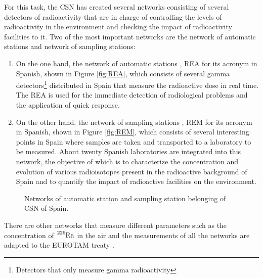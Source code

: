 \begin{enumerate}
For this task, the CSN has created several networks consisting of several detectors of radioactivity that are in charge of controlling the levels of radioactivity in the environment and checking the impact of radioactivity facilities to it. Two of the most important networks are the network of automatic stations and network of sampling stations:

\begin{enumerate}
\item{} On the one hand, the network of automatic stations \cite{REA}, REA for its acronym in Spanish, shown in Figure \ref{fig:REA}, which consists of several gamma detectors\footnote{Detectors that only measure gamma radioactivity} distributed in Spain that measure the radioactive dose in real time. The REA is used for the immediate detection of radiological problems and the application of quick response.

\item{} On the other hand, the network of sampling stations \cite{REM}, REM for its acronym in Spanish, shown in Figure \ref{fig:REM}, which consists of several interesting points in Spain where samples are taken and transported to a laboratory to be measured. About twenty Spanish laboratories are integrated into this network, the objective of which is to characterize the concentration and evolution of various radioisotopes present in the radioactive background of Spain and to quantify the impact of radioactive facilities on the environment.
\end{enumerate}

\begin{figure}[hbtp]
 \centering
 \caption{Networks of automatic station and sampling station belonging of CSN of Spain.}
 \label{fig:NetworksCSN}
\end{figure}

There are other networks that measure different parameters such as the concentration of $\ce{^{226}Ra}$ in the air and the measurements of all the networks are adapted to the EUROTAM treaty \cite{100BqL}.
\end{enumerate}

